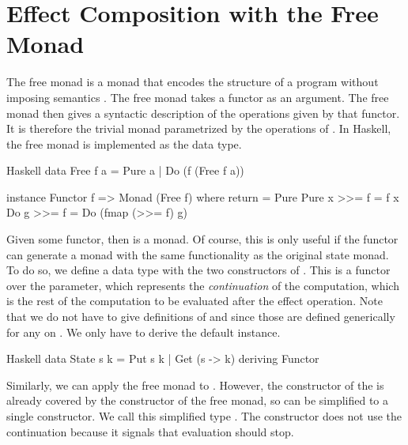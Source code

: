 \section{Effect Composition with the Free Monad}


The free monad is a monad that encodes the structure of a program without imposing semantics \citationneeded. The free monad takes a functor  as an argument. The free monad then gives a syntactic description of the operations given by that functor. It is therefore the trivial monad parametrized by the operations of . In Haskell, the free monad is implemented as the  data type.

\begin{lst}{Haskell}
data Free f a
  = Pure a
  | Do (f (Free f a))

instance Functor f => Monad (Free f) where
  return = Pure
  Pure x >>= f = f x
  Do g >>= f = Do (fmap (>>= f) g)
\end{lst}
%
Given some  functor, then  is a monad. Of course, this is only useful if the  functor can generate a monad with the same functionality as the original state monad. To do so, we define a data type with the two constructors of . This is a functor over the  parameter, which represents the \emph{continuation} of the computation, which is the rest of the computation to be evaluated after the effect operation. Note that we do not have to give definitions of  and \hs{>>=} since those are defined generically for any  on . We only have to derive the default  instance.

\begin{lst}{Haskell}
data State s k = Put s k | Get (s -> k)
  deriving Functor
\end{lst}
%
Similarly, we can apply the free monad to . However, the  constructor of the  is already covered by the  constructor of the free monad, so  can be simplified to a single constructor. We call this simplified type . The  constructor does not use the continuation because it signals that evaluation should stop.

